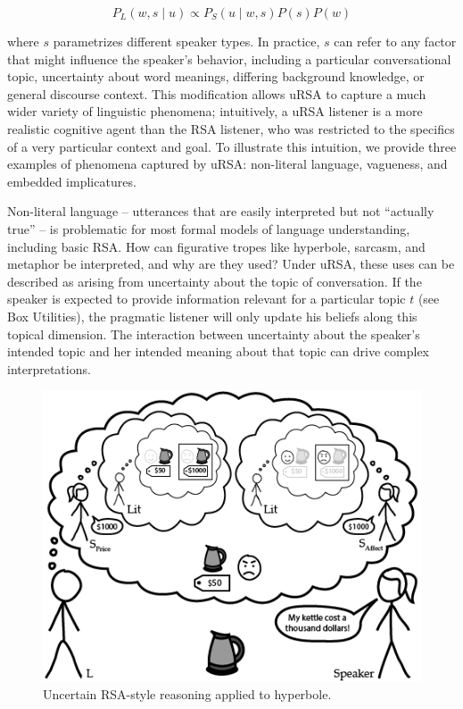 \documentclass[]{elsarticle}
\begin{document}
$$P_L(w,s\mid u) \propto
P_S(u\mid w,s)P(s)P(w)$$

where $s$ parametrizes different speaker types. In practice, $s$ can
refer to any factor that might influence the speaker's behavior,
including a particular conversational topic, uncertainty about word
meanings, differing background knowledge, or general discourse context.
This modification allows uRSA to capture a much wider variety of
linguistic phenomena; intuitively, a uRSA listener is a more realistic
cognitive agent than the RSA listener, who was restricted to the
specifics of a very particular context and goal. To illustrate this
intuition, we provide three examples of phenomena captured by uRSA:
non-literal language, vagueness, and embedded implicatures.

Non-literal language -- utterances that are easily interpreted but not
``actually true'' -- is problematic for most formal models of language
understanding, including basic RSA. How can figurative tropes like
hyperbole, sarcasm, and metaphor be interpreted, and why are they used?
Under uRSA, these uses can be described as arising from uncertainty
about the topic of conversation. If the speaker is expected to provide
information relevant for a particular topic $t$ (see Box Utilities),
the pragmatic listener will only update his beliefs along this topical
dimension. The interaction between uncertainty about the speaker's
intended topic and her intended meaning about that topic can drive
complex interpretations.

\begin{figure}[ht]
\begin{center}
\includegraphics[width=1.0\textwidth]{images/media/image03.png}
\caption{\label{fig:ursa} Uncertain RSA-style reasoning applied to hyperbole.}
\end{center}
\end{figure}
\end{document}
